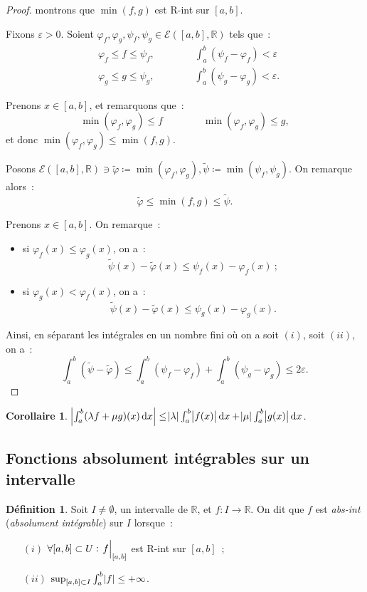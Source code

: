 \documentclass{report}
\newtheorem{cor}[thm]{Corollaire}
\theoremstyle{definition}
\newtheorem{déf}[thm]{Définition}
\theoremstyle{remark}
\newcommand{\R}{\mathbb R}
\newcommand{\El}[2]{\mathcal E\!\left(#1, #2\right)}
\newcommand{\restr}[2]{\left.#1\vphantom{\big|}\right|_{#2}}
\newcommand{\pinfty}{{+\infty}}
\begin{document}
			\begin{proof} montrons que $\min(f, g)$ est R-int sur $[a, b]$.

			Fixons $\varepsilon > 0$. Soient $\varphi_f, \varphi_g, \psi_f, \psi_g \in \El {[a, b]}\R$ tels que~:
			\begin{align*}
				&\varphi_f \leq f \leq \psi_f, \qquad\qquad \int_a^b(\psi_f - \varphi_f) < \varepsilon \\
				&\varphi_g \leq g \leq \psi_g, \qquad\qquad \int_a^b(\psi_g - \varphi_g) < \varepsilon.
			\end{align*}

			Prenons $x \in [a, b]$, et remarquons que~:
			\[\min(\varphi_f, \varphi_g) \leq f\qquad\qquad\min(\varphi_f, \varphi_g) \leq g,\]
			et donc $\min(\varphi_f, \varphi_g) \leq \min(f, g)$.

			Posons $\El {[a, b]}\R \ni \widetilde \varphi \coloneqq \min(\varphi_f, \varphi_g), \widetilde \psi \coloneq \min(\psi_f, \psi_g)$. On remarque alors~:
			\[\widetilde \varphi \leq \min(f, g) \leq \widetilde \psi.\]

			Prenons $x \in [a, b]$. On remarque~:
			\begin{itemize}
				\item si $\varphi_f(x) \leq \varphi_g(x)$, on a~:
				\[\widetilde \psi(x) - \widetilde \varphi(x) \leq \psi_f(x) - \varphi_f(x)~;\]
				\item si $\varphi_g(x) < \varphi_f(x)$, on a~:
				\[\widetilde \psi(x) - \widetilde \varphi(x) \leq \psi_g(x) - \varphi_g(x).\]
			\end{itemize}

			Ainsi, en séparant les intégrales en un nombre fini où on a soit $(i)$, soit $(ii)$, on a~:
			\[\int_a^b (\widetilde \psi - \widetilde \varphi) \leq \int_a^b (\psi_f - \varphi_f) + \int_a^b (\psi_g - \varphi_g) \leq 2\varepsilon.\]
			\end{proof}

			\begin{cor} $\abs {\int_a^b (\lambda f + \mu g)(x)\dif x} \leq \abs \lambda \int_a^b \abs {f(x)}\dif x + \abs \mu \int_a^b\abs {g(x)}\dif x$.
			\end{cor}
		\subsection{Fonctions absolument intégrables sur un intervalle}
			\begin{déf} Soit $I \neq \emptyset$, un intervalle de $\R$, et $f : I \to \R$. On dit que $f$ est \textit{abs-int} (\textit{absolument intégrable})
			sur $I$ lorsque~:
			\begin{itemize}
				\item[$(i)$] $\forall [a, b] \subset U : \restr f{[a, b]}$ est R-int sur $[a, b]$~;
				\item[$(ii)$] $\sup_{[a, b] \subset I} \int_a^b \abs f \leq \pinfty$.
			\end{itemize}
			\end{déf}
\end{document}
